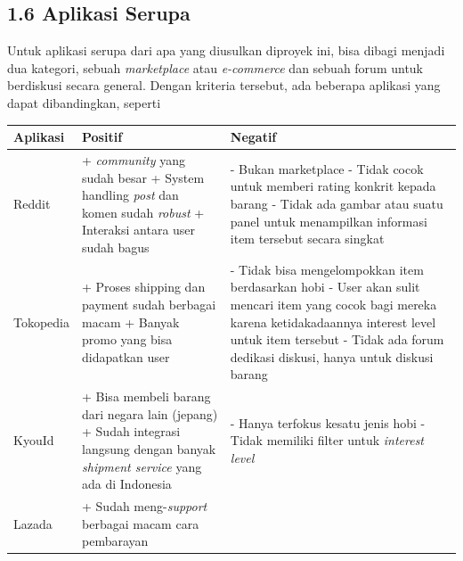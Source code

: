 \documentclass[a4paper]{article}
\begin{document}
\subsection*{1.6 Aplikasi Serupa}
Untuk aplikasi serupa dari apa yang diusulkan diproyek ini, bisa dibagi menjadi dua kategori, sebuah \textit{marketplace} atau \textit{e-commerce} dan sebuah forum untuk berdiskusi secara general. Dengan kriteria tersebut, ada beberapa aplikasi yang dapat dibandingkan, seperti
\begin{longtable}{|m{2cm}|p{5cm}|p{5cm}|}
    \hline
    Aplikasi & Positif                                                     & Negatif             \\
    \hline
    Reddit
        & + \textit{community} yang sudah besar \newline
            + System handling \textit{post} dan komen sudah \textit{robust} \newline
            + Interaksi antara user sudah bagus
        & - Bukan marketplace \newline
            - Tidak cocok untuk memberi rating konkrit kepada barang \newline
            - Tidak ada gambar atau suatu panel untuk menampilkan informasi item tersebut secara singkat \\
    \hline
    Tokopedia
        & + Proses shipping dan payment sudah berbagai macam \newline
            + Banyak promo yang bisa didapatkan user
        & - Tidak bisa mengelompokkan item berdasarkan hobi \newline
            - User akan sulit mencari item yang cocok bagi mereka karena ketidakadaannya interest level untuk item tersebut \newline
            - Tidak ada forum dedikasi diskusi, hanya untuk diskusi barang\\
    \hline
    KyouId
        & + Bisa membeli barang dari negara lain (jepang) \newline
            + Sudah integrasi langsung dengan banyak \textit{shipment service} yang ada di Indonesia \newline
        & - Hanya terfokus kesatu jenis hobi \newline
            - Tidak memiliki filter untuk \textit{interest level}\\
    \hline
    Lazada
        & + Sudah meng-\textit{support} berbagai macam cara pembarayan\newline

\end{longtable}
\end{document}
